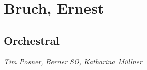 \chapter{Bruch, Ernest}
\label{cha:bruch}

\section{Orchestral}

 \textit{Tim Posner, Berner SO, Katharina M\"{u}llner} 



